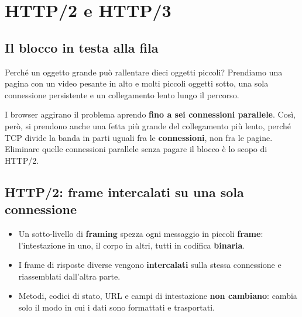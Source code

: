 
\section{HTTP/2 e HTTP/3}

\subsection{Il blocco in testa alla fila}

Perché un oggetto grande può rallentare dieci oggetti piccoli? Prendiamo una pagina con un video pesante
in alto e molti piccoli oggetti sotto, una sola connessione persistente e un collegamento lento lungo il
percorso.


I browser aggirano il problema aprendo \textbf{fino a sei connessioni parallele}. Così, però, si prendono
anche una fetta più grande del collegamento più lento, perché TCP divide la banda in parti uguali fra le
\textbf{connessioni}, non fra le pagine. Eliminare quelle connessioni parallele senza pagare il blocco è lo
scopo di HTTP/2.

\subsection{HTTP/2: frame intercalati su una sola connessione}

\begin{itemize}
    \item Un sotto-livello di \textbf{framing} spezza ogni messaggio in piccoli \textbf{frame}: l'intestazione
          in uno, il corpo in altri, tutti in codifica \textbf{binaria}.
    \item I frame di risposte diverse vengono \textbf{intercalati} sulla stessa connessione e riassemblati
          dall'altra parte.
    \item Metodi, codici di stato, URL e campi di intestazione \textbf{non cambiano}: cambia solo il modo in
          cui i dati sono formattati e trasportati.
\end{itemize}

